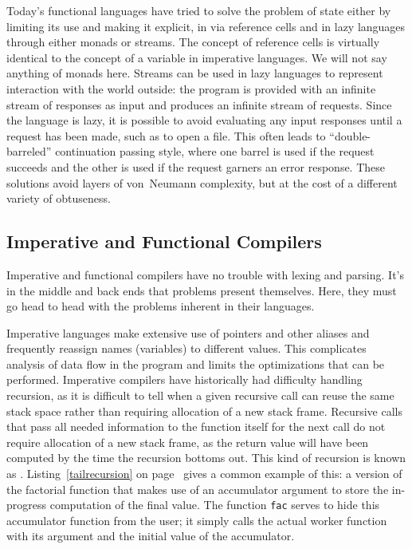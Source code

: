 Today's functional languages have tried to solve the problem of state either by limiting its use and making it explicit, in \ML via reference cells and in lazy languages through either monads or streams. The \ML concept of reference cells is virtually identical to the concept of a variable in imperative languages. We will not say anything of monads here. Streams can be used in lazy languages to represent interaction with the world outside: the program is provided with an infinite stream of responses as input and produces an infinite stream of requests. Since the language is lazy, it is possible to avoid evaluating any input responses until a request has been made, such as to open a file. This often leads to ``double-barreled'' continuation passing style, where one barrel is used if the request succeeds and the other is used if the request garners an error response. These solutions avoid layers of von~Neumann complexity, but at the cost of a different variety of obtuseness.

\subsection*{Imperative and Functional Compilers}
Imperative and functional compilers have no trouble with lexing and parsing. It's in the middle and back ends that problems present themselves. Here, they must go head to head with the problems inherent in their languages.

Imperative languages make extensive use of pointers and other aliases and frequently reassign names (variables) to different values. This complicates analysis of data flow in the program and limits the optimizations that can be performed. Imperative compilers have historically had difficulty handling recursion, as it is difficult to tell when a given recursive call can reuse the same stack space rather than requiring allocation of a new stack frame. Recursive calls that pass all needed information to the function itself for the next call do not require allocation of a new stack frame, as the return value will have been computed by the time the recursion bottoms out. This kind of recursion is known as . Listing~\ref{tailrecursion} on page~\pageref{tailrecursion} gives a common example of this: a version of the factorial function that makes use of an accumulator argument to store the in-progress computation of the final value. The function \lstinline{fac} serves to hide this accumulator function from the user; it simply calls the actual worker function with its argument and the initial value of the accumulator.

